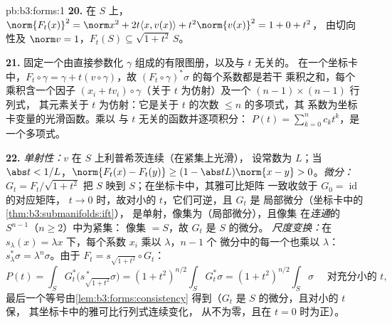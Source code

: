 \begin{solution}{pb:b3:forms:1}
\textbf{20.} 在 $S$ 上，$\norm{F_t(x)}^2 = \norm x^2 +
2t\langle x, v(x)\rangle + t^2\norm{v(x)}^2 = 1 + 0 + t^2$，
由切向性及 $\norm v = 1$，$F_t(S) \subseteq
\sqrt{1+t^2}\,S$。

\textbf{21.} 固定一个由直接参数化
$\gamma$ 组成的有限图册，以及与 $t$ 无关的。
在一个坐标卡中，$F_t\circ\gamma = \gamma + t(v\circ\gamma)$，故
$(F_t\circ\gamma)^*\sigma$ 的每个系数都是若干
乘积之和，每个乘积含一个因子 $(x_i + tv_i)\circ\gamma$（关于
$t$ 为仿射）及一个 $(n-1)\times(n-1)$ 行列式，
其元素关于 $t$ 为仿射：它是关于 $t$ 的次数 $\leq n$ 的多项式，其
系数为坐标卡变量的光滑函数。乘以
与 $t$ 无关的函数并逐项积分：
$P(t) = \sum_{k=0}^n c_kt^k$，是一个多项式。

\textbf{22.} \emph{单射性：}$v$ 在 $S$ 上利普希茨连续（在紧集上光滑），
设常数为 $L$；当 $\abs t <
1/L$，$\norm{F_t(x) - F_t(y)} \geq (1 - \abs
tL)\norm{x - y} > 0$。\emph{微分：}$G_t =
F_t/\sqrt{1 + t^2}$ 把 $S$ 映到 $S$；在坐标卡中，其雅可比矩阵
一致收敛于 $G_0 = \operatorname{id}$ 的对应矩阵，
$t \to 0$ 时，故对小的 $t$，它们可逆，且 $G_t$ 是
局部微分（坐标卡中的\cref{thm:b3:submanifolds:ift}），
是单射，像集为（局部微分），且像集
在\emph{连通}的 $S^{n-1}$（$n \geq 2$）中为紧集：
像集 $= S$，故 $G_t$ 是 $S$ 的微分。
\emph{尺度变换：}在 $s_\lambda(x) = \lambda x$ 下，每个系数
$x_i$ 乘以 $\lambda$，$n - 1$ 个
微分中的每一个也乘以 $\lambda$：$s_\lambda^*\sigma =
\lambda^n\sigma$。由于 $F_t = s_{\sqrt{1+t^2}}\circ G_t$：
\[
P(t) = \int_SG_t^*\bigl(s_{\sqrt{1+t^2}}^{\,*}\sigma\bigr)
= (1 + t^2)^{n/2}\int_SG_t^*\sigma
= (1 + t^2)^{n/2}\int_S\sigma
\quad\text{ 对充分小的 } t,
\]
最后一个等号由\cref{lem:b3:forms:consistency} 得到（$G_t$
是 $S$ 的微分，且对小的 $t$ 保，
其坐标卡中的雅可比行列式连续变化，
从不为零，且在 $t = 0$ 时为正）。


\end{solution}
